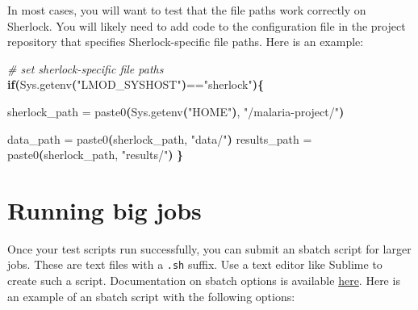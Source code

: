\documentclass[
]{book}
\newenvironment{Shaded}{\begin{snugshade}}{\end{snugshade}}
\newcommand{\CommentTok}[1]{\textcolor[rgb]{0.56,0.35,0.01}{\textit{#1}}}
\newcommand{\ControlFlowTok}[1]{\textcolor[rgb]{0.13,0.29,0.53}{\textbf{#1}}}
\newcommand{\ErrorTok}[1]{\textcolor[rgb]{0.64,0.00,0.00}{\textbf{#1}}}
\newcommand{\ExtensionTok}[1]{#1}
\newcommand{\KeywordTok}[1]{\textcolor[rgb]{0.13,0.29,0.53}{\textbf{#1}}}
\newcommand{\NormalTok}[1]{#1}
\newcommand{\StringTok}[1]{\textcolor[rgb]{0.31,0.60,0.02}{#1}}
\begin{document}
In most cases, you will want to test that the file paths work correctly on Sherlock. You will likely need to add code to the configuration file in the project repository that specifies Sherlock-specific file paths. Here is an example:

\begin{Shaded}
\begin{Highlighting}[]
\CommentTok{\# set sherlock{-}specific file paths}
\ControlFlowTok{if}\KeywordTok{(}\ExtensionTok{Sys.getenv}\ErrorTok{(}\StringTok{"LMOD\_SYSHOST"}\KeywordTok{)}\ExtensionTok{==}\StringTok{"sherlock"}\KeywordTok{)\{}
  
  \ExtensionTok{sherlock\_path}\NormalTok{ = paste0}\ErrorTok{(}\ExtensionTok{Sys.getenv}\ErrorTok{(}\StringTok{"HOME"}\KeywordTok{)}\ExtensionTok{,} \StringTok{"/malaria{-}project/"}\KeywordTok{)}
  
  \ExtensionTok{data\_path}\NormalTok{ = paste0}\ErrorTok{(}\ExtensionTok{sherlock\_path,} \StringTok{"data/"}\KeywordTok{)}
  \ExtensionTok{results\_path}\NormalTok{ = paste0}\ErrorTok{(}\ExtensionTok{sherlock\_path,} \StringTok{"results/"}\KeywordTok{)}
\KeywordTok{\}}
\end{Highlighting}
\end{Shaded}

\hypertarget{running-big-jobs-1}{%
\section{Running big jobs}\label{running-big-jobs-1}}

Once your test scripts run successfully, you can submit an sbatch script for larger jobs. These are text files with a \texttt{.sh} suffix. Use a text editor like Sublime to create such a script. Documentation on sbatch options is available \href{https://slurm.schedmd.com/sbatch.html}{here}. Here is an example of an sbatch script with the following options:
\end{document}
